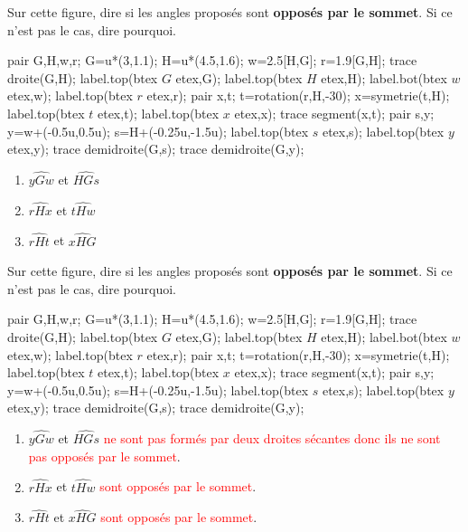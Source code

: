 \begin{exercice*}
    Sur cette figure, dire si les angles proposés sont \textbf{opposés par le sommet}. Si ce n'est pas le cas, dire pourquoi.\par
    \begin{Geometrie}[CoinHD={(6u,3u)}]
        pair G,H,w,r;
        G=u*(3,1.1);
        H=u*(4.5,1.6);
        w=2.5[H,G];
        r=1.9[G,H];
        trace droite(G,H);
        label.top(btex $G$ etex,G);
        label.top(btex $H$ etex,H);
        label.bot(btex $w$ etex,w);
        label.top(btex $r$ etex,r);
        pair x,t;
        t=rotation(r,H,-30);
        x=symetrie(t,H);
        label.top(btex $t$ etex,t);
        label.top(btex $x$ etex,x);
        trace segment(x,t);
        pair s,y;
        y=w+(-0.5u,0.5u);
        s=H+(-0.25u,-1.5u);
        label.top(btex $s$ etex,s);
        label.top(btex $y$ etex,y);
        trace demidroite(G,s);
        trace demidroite(G,y);
    \end{Geometrie}
    \begin{enumerate}
        \item $\widehat{yGw}$ et $\widehat{HGs}$
        \item $\widehat{rHx}$ et $\widehat{tHw}$
        \item $\widehat{rHt}$ et $\widehat{xHG}$
    \end{enumerate}
\end{exercice*}
\begin{corrige}
    Sur cette figure, dire si les angles proposés sont \textbf{opposés par le sommet}. Si ce n'est pas le cas, dire pourquoi. \par
    \begin{Geometrie}[CoinHD={(6u,3u)}]
        pair G,H,w,r;
        G=u*(3,1.1);
        H=u*(4.5,1.6);
        w=2.5[H,G];
        r=1.9[G,H];
        trace droite(G,H);
        label.top(btex $G$ etex,G);
        label.top(btex $H$ etex,H);
        label.bot(btex $w$ etex,w);
        label.top(btex $r$ etex,r);
        pair x,t;
        t=rotation(r,H,-30);
        x=symetrie(t,H);
        label.top(btex $t$ etex,t);
        label.top(btex $x$ etex,x);
        trace segment(x,t);
        pair s,y;
        y=w+(-0.5u,0.5u);
        s=H+(-0.25u,-1.5u);
        label.top(btex $s$ etex,s);
        label.top(btex $y$ etex,y);
        trace demidroite(G,s);
        trace demidroite(G,y);
    \end{Geometrie}
    \par
    \begin{enumerate}
        \item $\widehat{yGw}$ et $\widehat{HGs}$ \textcolor{red}{ne sont pas formés par deux droites sécantes donc ils ne sont pas opposés par le sommet}.
        \item $\widehat{rHx}$ et $\widehat{tHw}$ \textcolor{red}{sont opposés par le sommet}.
        \item $\widehat{rHt}$ et $\widehat{xHG}$ \textcolor{red}{sont opposés par le sommet}.
    \end{enumerate}
\end{corrige}